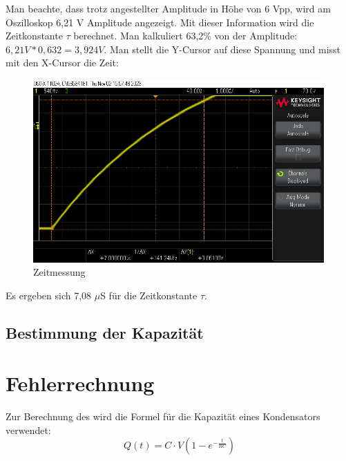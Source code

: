 Man beachte, dass trotz angestellter Amplitude in Höhe von
6 Vpp, wird am Oszilloskop 6,21 V Amplitude angezeigt. Mit dieser 
Information wird die Zeitkonstante $\tau$ berechnet. Man kalkuliert
63,2\% von der Amplitude: $6,21V * 0,632 = 3,924V$. Man stellt die 
Y-Cursor auf diese Spannung und misst mit den X-Cursor die Zeit:
\begin{figure}[H]
	\centering
	\includegraphics[height=7cm]{images/Versuch1/Zeitmessung.png} 
	\caption{Zeitmessung}
	\label{fig: Zeitmessung}
\end{figure}

Es ergeben sich 7,08 $\mu$S für die Zeitkonstante $\tau$. 

\subsection{Bestimmung der Kapazität}



\section{Fehlerrechnung}


Zur Berechnung des wird die Formel für die Kapazität eines Kondensators verwendet:
\begin{equation}
    Q(t) = C \cdot V \left(1 - e^{-\frac{t}{RC}}\right)
\end{equation}